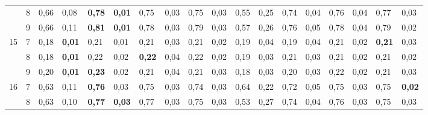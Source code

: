 \documentclass[conference]{IEEEtran}
\begin{document}
\begin{table*}[]
\begin{tabular}{|cl|ll|ll|ll|ll|ll|ll|ll|ll|}
		\multicolumn{1}{|c|}{} & 8 & \multicolumn{1}{l|}{0,66} & 0,08 & \multicolumn{1}{l|}{\textbf{0,78}} & \textbf{0,01} & \multicolumn{1}{l|}{0,75} & 0,03 & \multicolumn{1}{l|}{0,75} & 0,03 & \multicolumn{1}{l|}{0,55} & 0,25 & \multicolumn{1}{l|}{0,74} & 0,04 & \multicolumn{1}{l|}{0,76} & 0,04 & \multicolumn{1}{l|}{0,77} & 0,03 \\ \cline{2-18} 
		\multicolumn{1}{|c|}{} & 9 & \multicolumn{1}{l|}{0,66} & 0,11 & \multicolumn{1}{l|}{\textbf{0,81}} & \textbf{0,01} & \multicolumn{1}{l|}{0,78} & 0,03 & \multicolumn{1}{l|}{0,79} & 0,03 & \multicolumn{1}{l|}{0,57} & 0,26 & \multicolumn{1}{l|}{0,76} & 0,05 & \multicolumn{1}{l|}{0,78} & 0,04 & \multicolumn{1}{l|}{0,79} & 0,02 \\ \hline
		\multicolumn{1}{|c|}{\multirow{3}{*}{15}} & 7 & \multicolumn{1}{l|}{0,18} & \textbf{0,01} & \multicolumn{1}{l|}{0,21} & 0,01 & \multicolumn{1}{l|}{0,21} & 0,03 & \multicolumn{1}{l|}{0,21} & 0,02 & \multicolumn{1}{l|}{0,19} & 0,04 & \multicolumn{1}{l|}{0,19} & 0,04 & \multicolumn{1}{l|}{0,21} & 0,02 & \multicolumn{1}{l|}{\textbf{0,21}} & 0,03 \\ \cline{2-18} 
		\multicolumn{1}{|c|}{} & 8 & \multicolumn{1}{l|}{0,18} & \textbf{0,01} & \multicolumn{1}{l|}{0,22} & 0,02 & \multicolumn{1}{l|}{\textbf{0,22}} & 0,04 & \multicolumn{1}{l|}{0,22} & 0,02 & \multicolumn{1}{l|}{0,19} & 0,03 & \multicolumn{1}{l|}{0,21} & 0,03 & \multicolumn{1}{l|}{0,21} & 0,02 & \multicolumn{1}{l|}{0,21} & 0,02 \\ \cline{2-18} 
		\multicolumn{1}{|c|}{} & 9 & \multicolumn{1}{l|}{0,20} & \textbf{0,01} & \multicolumn{1}{l|}{\textbf{0,23}} & 0,02 & \multicolumn{1}{l|}{0,21} & 0,04 & \multicolumn{1}{l|}{0,21} & 0,03 & \multicolumn{1}{l|}{0,18} & 0,03 & \multicolumn{1}{l|}{0,20} & 0,03 & \multicolumn{1}{l|}{0,22} & 0,02 & \multicolumn{1}{l|}{0,21} & 0,03 \\ \hline
		\multicolumn{1}{|c|}{\multirow{3}{*}{16}} & 7 & \multicolumn{1}{l|}{0,63} & 0,11 & \multicolumn{1}{l|}{\textbf{0,76}} & 0,03 & \multicolumn{1}{l|}{0,75} & 0,03 & \multicolumn{1}{l|}{0,74} & 0,03 & \multicolumn{1}{l|}{0,64} & 0,22 & \multicolumn{1}{l|}{0,72} & 0,05 & \multicolumn{1}{l|}{0,75} & 0,03 & \multicolumn{1}{l|}{0,75} & \textbf{0,02} \\ \cline{2-18} 
		\multicolumn{1}{|c|}{} & 8 & \multicolumn{1}{l|}{0,63} & 0,10 & \multicolumn{1}{l|}{\textbf{0,77}} & \textbf{0,03} & \multicolumn{1}{l|}{0,77} & 0,03 & \multicolumn{1}{l|}{0,75} & 0,03 & \multicolumn{1}{l|}{0,53} & 0,27 & \multicolumn{1}{l|}{0,74} & 0,04 & \multicolumn{1}{l|}{0,76} & 0,03 & \multicolumn{1}{l|}{0,75} & 0,03 \\ \cline{2-18} 

\end{tabular}
\end{table*}
\end{document}
